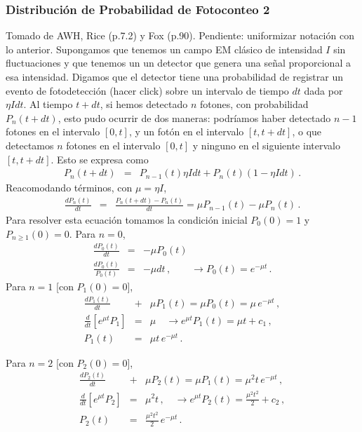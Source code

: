 \documentclass[twocolumn,aps,eqsecnum,showkeys,amsmath]{revtex4}
\begin{document}
\subsubsection{Distribuci\'on  de Probabilidad de Fotoconteo 2} %
Tomado de AWH, Rice (p.7.2) y Fox (p.90).  Pendiente: uniformizar  
notaci\'on con lo anterior. 
\newline Supongamos que tenemos un campo EM cl\'asico de intensidad 
$I$ sin fluctuaciones y que tenemos un un detector que genera una 
se\~nal proporcional a esa intensidad. Digamos que el detector tiene una 
probabilidad de registrar un evento de fotodetecci\'on (hacer click) sobre 
un intervalo de tiempo $dt$ dada por $\eta I dt$. Al tiempo $t+dt$, si 
hemos detectado $n$ fotones, con probabilidad $P_n(t+dt)$, esto pudo 
ocurrir de dos maneras: podr\'iamos haber detectado $n-1$ fotones en el 
intervalo $[0,t]$, y un fot\'on en el intervalo $[t,t+dt]$, o que detectamos 
$n$ fotones en el intervalo $[0,t]$ y ninguno en el siguiente intervalo 
$[t,t+dt]$. Esto se expresa como 
%
\begin{eqnarray*}
P_n(t+dt) &=& P_{n-1}(t) \eta I dt +P_n(t) (1-\eta I dt) \,.
\end{eqnarray*}
Reacomodando t\'erminos, con $\mu= \eta I$, 
%
\begin{eqnarray*}
\frac{d P_n(t)}{dt} &=& \frac{ P_n(t+dt) -P_n(t)}{dt} 
	=\mu P_{n-1}(t) -\mu P_n(t)  \,.
\end{eqnarray*}
Para resolver esta ecuaci\'on tomamos la condici\'on inicial $P_0(0)=1$ 
y $P_{n\geq 1}(0) =0$. Para $n=0$, 
%
\begin{eqnarray*}
\frac{d P_0(t)}{dt} &=& -\mu P_0(t) 		\\
\frac{d P_0(t)}{P_0(t)} &=& -\mu dt \,, \qquad \to P_0(t)= e^{-\mu t} \,.
\end{eqnarray*}
Para $n=1$ [con $P_1(0)=0$], 
%
\begin{eqnarray*}
\frac{d P_1(t)}{dt} &+&\mu P_1(t) = \mu P_0(t) =\mu \,e^{-\mu t} \,,	\\	
\frac{d}{dt} \left[ e^{\mu t} P_1  \right] &=& \mu 	
	\quad \to e^{\mu t} P_1(t) = \mu t +c_1 	\,, \\ 
P_1(t) &=& \mu t \,e^{-\mu t} 	\,.
\end{eqnarray*}

Para $n=2$ [con $P_2(0)=0$], 
%
\begin{eqnarray*}
\frac{d P_2(t)}{dt} &+&\mu P_2(t) = \mu P_1(t) =\mu^2 t \,e^{-\mu t}  \,, \\	
\frac{d}{dt} \left[ e^{\mu t} P_2  \right] &=& \mu^2 t 	\,, 
	\quad \to e^{\mu t} P_2(t) = \frac{\mu^2 t^2}{2} +c_2 	\,,\\ 
P_2(t) &=& \frac{\mu^2 t^2}{2} \,e^{-\mu t} 	\,.
\end{eqnarray*}
\end{document}
